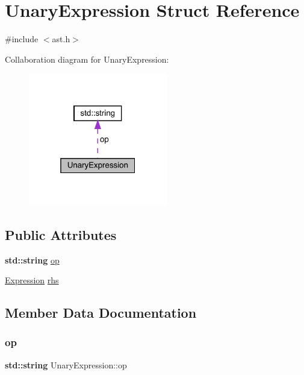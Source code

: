 \hypertarget{struct_unary_expression}{}\section{Unary\+Expression Struct Reference}
\label{struct_unary_expression}


{\ttfamily \#include $<$ast.\+h$>$}



Collaboration diagram for Unary\+Expression\+:\nopagebreak
\begin{figure}[H]
\begin{center}
\leavevmode
\includegraphics[width=172pt]{struct_unary_expression__coll__graph}
\end{center}
\end{figure}
\subsection*{Public Attributes}
\begin{DoxyCompactItemize}
\item 
\textbf{ std\+::string} \hyperlink{struct_unary_expression_a057cfd54844d5b36e15f16ee5272b071}{op}
\item 
\hyperlink{ast_8h_a4cb273a4d960cd13ea17d08f254493e8}{Expression} \hyperlink{struct_unary_expression_ae574f5f744a28eb02d260a40127b74dc}{rhs}
\end{DoxyCompactItemize}


\subsection{Member Data Documentation}
\mbox{\label{struct_unary_expression_a057cfd54844d5b36e15f16ee5272b071}} 
\subsubsection{\texorpdfstring{op}{op}}
{\footnotesize\ttfamily \textbf{ std\+::string} Unary\+Expression\+::op}

